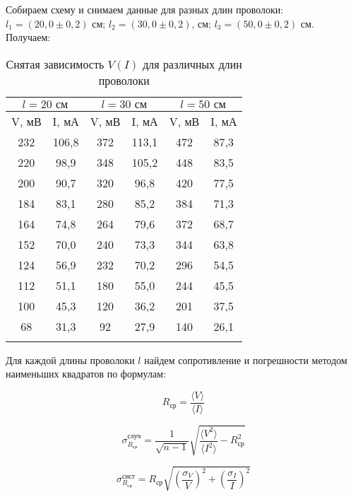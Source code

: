 \documentclass[a4paper, 12pt]{article}
\begin{document}
	Собираем схему и снимаем данные для разных длин проволоки: \\ $l_1=(20,0 \pm 0,2)\text{ см}$; $l_2=(30,0 \pm 0,2) \text{, см}$; $ l_3=(50,0 \pm 0,2)\text{ см}$. Получаем:
	\begin{longtable}[H]{|c|c||c|c||c|c|}
		\hline
		\multicolumn{2}{|c||}{$l = 20 \text{ см}$} & \multicolumn{2}{c||}{$l = 30 \text{ см}$} & \multicolumn{2}{c|}{$l = 50 \text{ см}$}  \\
		\hline
		 V, мВ & I, мА & V, мВ & I, мА & V, мВ & I, мА \\
		\hline
		  232 & 106,8 & 372 & 113,1  & 472 & 87,3 \\
		\hline
		  220 & 98,9 & 348 & 105,2  & 448 & 83,5 \\
		\hline
		  200 & 90,7 & 320 & 96,8  & 420 & 77,5 \\
		\hline
		  184 & 83,1 & 280 & 85,2 & 384 & 71,3 \\
		\hline
		  164 & 74,8 & 264 & 79,6  & 372 & 68,7 \\
		\hline
		  152 & 70,0 & 240 & 73,3  & 344 & 63,8 \\
		\hline
		  124 & 56,9 & 232 & 70,2  & 296 & 54,5 \\
		\hline
		  112 & 51,1 & 180 & 55,0  & 244 & 45,5 \\
		\hline
		  100 & 45,3 & 120 & 36,2  & 201 & 37,5 \\
		\hline
		  68 & 31,3  & 92 & 27,9  & 140 & 26,1 \\
		\hline
		\caption{Снятая зависимость $V(I)$ для различных длин проволоки}
	\end{longtable}


	
	Для каждой длины проволоки $l$ найдем  сопротивление и погрешности методом наименьших квадратов по формулам:
	
	\begin{equation}
		R_\text{ср} = \frac{\langle V\rangle}{\langle I \rangle}
	\end{equation}


	
        \centering
        \begin{equation}
            \sigma_{R_\text{ср}}^{\text{случ}} = \frac{1}{\sqrt{n - 1}}\sqrt{\frac{\langle V^2 \rangle}{\langle I^2 \rangle} - R_\text{ср}^2}
        \end{equation}
    
    
        \centering
        
        \begin{equation}
            \sigma_{R_\text{ср}}^{\text{сист}} = R_\text{ср}\sqrt{\left(\frac{\sigma_V}{V} \right)^2 + \left(\frac{\sigma_I}{I} \right)^2}
        \end{equation}
	
\end{document}
